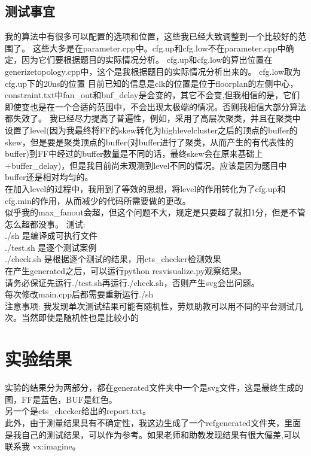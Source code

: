 \documentclass[12pt]{ctexart}
\begin{document}
\subsection{测试事宜}
我的算法中有很多可以配置的选项和位置，这些我已经大致调整到一个比较好的范围了。
这些大多是在parameter.cpp中。cfg.up和cfg.low不在parameter.cpp中确定，因为它们要根据题目的实际情况分析。
cfg.up和cfg.low的算出位置在generizetopology.cpp中，这个是我根据题目的实际情况分析出来的。 cfg.low取为cfg.up下的20ns的位置
目前已知的信息是clk的位置是位于floorplan的左侧中心，constraint.txt中fan\_out和buf\_delay是会变的，其它不会变,但我相信的是，它们即使变也是在一个合适的范围中，不会出现太极端的情况。否则我相信大部分算法都失效了。
我已经尽力提高了普遍性，例如，采用了高层次聚类，并且在聚类中设置了level(因为我最终将FF的skew转化为highlevelcluster之后的顶点的buffer的skew，但是要是聚类顶点的buffer(对buffer进行了聚类，从而产生的有代表性的buffer)到FF中经过的buffer数量是不同的话，最终skew会在原来基础上+buffer\_delay)，但是我目前尚未观测到level不同的情况。应该是因为题目中buffer还是相对均匀的。  \\
在加入level的过程中，我用到了等效的思想，将level的作用转化为了cfg.up和cfg.min的作用，从而减少的代码所需要做的更改。\\
似乎我的max\_fanout会超，但这个问题不大，规定是只要超了就扣1分，但是不管怎么超都没事。
测试:\\
./sh  是编译成可执行文件\\
./test.sh 是逐个测试案例\\
./check.sh 是根据逐个测试的结果，用cts\_checker检测效果  \\
在产生generated之后，可以运行python resvisualize.py观察结果。\\
请务必保证先运行./test.sh再运行./check.sh，否则产生svg会出问题。\\
每次修改main.cpp后都需要重新运行./sh   \\
注意事项:
我发现单次测试结果可能有随机性，劳烦助教可以用不同的平台测试几次。当然即使是随机性也是比较小的   \\
\section{实验结果}
实验的结果分为两部分，都在generated文件夹中一个是svg文件，这是最终生成的图，FF是蓝色，BUF是红色。 \\
另一个是cts\_checker给出的report.txt。   \\
此外，由于测量结果具有不确定性，我这边生成了一个refgenerated文件夹，里面是我自己的测试结果，可以作为参考。如果老师和助教发现结果有很大偏差,可以联系我 vx:imagine。
\end{document}
